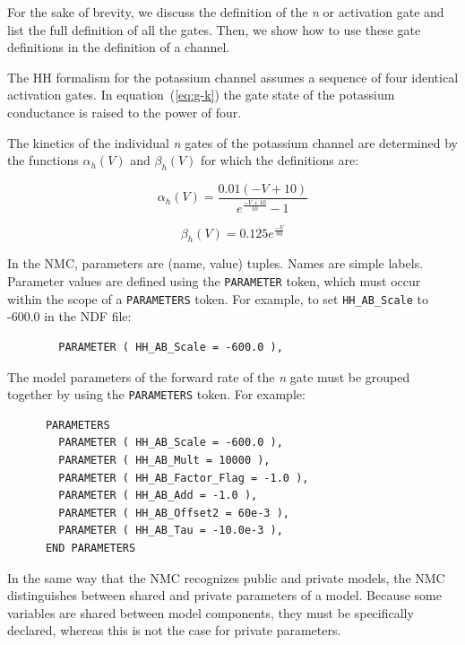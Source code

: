 \documentclass[12pt]{article}
\begin{document}
For the sake of brevity, we discuss the definition of the {\it n} or
activation gate and list the full
definition of all the gates.  Then, we show how to use these gate
definitions in the definition of a channel.


The HH formalism for the potassium channel assumes a sequence of four
identical activation gates.  In
equation~(\ref{eq:g-k}) the gate state of the
potassium conductance is raised to the power of four.

The kinetics of the individual {\it n} gates of the potassium channel are
determined by the functions $\alpha_h(V)$ and $\beta_h(V)$ for which
the definitions are:

\begin{equation}
  \label{eq:hh-alpha}
  \alpha_h(V) = \frac{0.01(-V + 10)}{e^{\frac{-V + 10}{10}} -
    1}
\end{equation}

\begin{equation}
  \label{eq:hh-beta}
  \beta_h(V) = 0.125 e^{ \frac{- V}{80} }
\end{equation}

In the NMC, parameters are (name, value) tuples.  Names are simple
labels.  Parameter values are defined using the {\tt PARAMETER} token,
which must occur within the scope of a {\tt PARAMETERS} token. For example, to set {\tt HH\_AB\_Scale}
to -600.0 in the NDF file:

\begin{verbatim}
        PARAMETER ( HH_AB_Scale = -600.0 ),
\end{verbatim}

The model parameters of the forward rate of the {\it n} gate must be
grouped together by using the {\tt PARAMETERS} token.  For example:

\begin{verbatim}
      PARAMETERS
        PARAMETER ( HH_AB_Scale = -600.0 ),
        PARAMETER ( HH_AB_Mult = 10000 ),
        PARAMETER ( HH_AB_Factor_Flag = -1.0 ),
        PARAMETER ( HH_AB_Add = -1.0 ),
        PARAMETER ( HH_AB_Offset2 = 60e-3 ),
        PARAMETER ( HH_AB_Tau = -10.0e-3 ),
      END PARAMETERS
\end{verbatim}

In the same way that the NMC recognizes public and private models, the
NMC distinguishes between shared and private parameters of a model.
Because some variables are shared between model components, they must
be specifically declared, whereas this is not the case for private
parameters.
\end{document}
